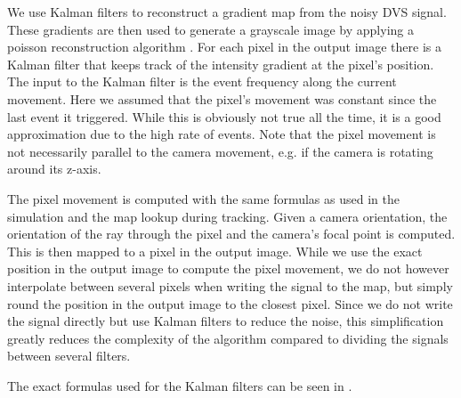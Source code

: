 We use Kalman filters to reconstruct a gradient map from the noisy DVS signal.
These gradients are then used to generate a grayscale image by applying a
poisson reconstruction algorithm \cite{raskarpoisson}. For each pixel in the
output image there is a Kalman filter that keeps track of the intensity gradient at
the pixel's position. The input to the Kalman filter is the event frequency
along the current movement. Here we assumed that the pixel's
movement was constant since the last event it triggered. While this is
obviously not true all the time, it is a good approximation due to the high
rate of events. Note that the pixel movement is not necessarily parallel to the
camera movement, e.g. if the camera is rotating around its z-axis.

The pixel movement is computed with the same formulas as used in the
simulation and the map lookup during tracking. Given a camera orientation, the
orientation of the ray through the pixel and the camera's focal point is
computed. This is then mapped to a pixel in the output image. While we use the
exact position in the output image to compute the pixel movement,  we do not
however interpolate between several pixels when writing the signal to the map,
but simply round the position in the output image to the closest pixel. Since
we do not write the signal directly but use Kalman filters to reduce the noise,
this simplification greatly reduces the complexity of the algorithm compared to
dividing the signals between several filters.

The exact formulas used for the Kalman filters can be seen in
\cite{kim2014simultaneous}.
